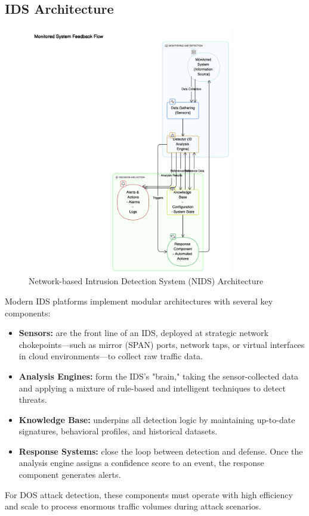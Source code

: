 \documentclass[16pt]{report}
\begin{document}
\subsection{IDS Architecture}
\begin{figure}[H]
    \centering
    \includegraphics[width=0.8\textwidth]{images/ids-arch-diagram.png}
    \caption{Network-based Intrusion Detection System (NIDS) Architecture}
    \label{fig:nids-architecture}
\end{figure}

Modern IDS platforms implement modular architectures with several key components:
\begin{itemize}
    \item \textbf{Sensors:} are the front line of an IDS, deployed at strategic network chokepoints—such as mirror (SPAN) ports, network taps, or virtual interfaces in cloud environments—to collect raw traffic data.
    \item \textbf{Analysis Engines:} form the IDS's "brain," taking the sensor-collected data and applying a mixture of rule-based and intelligent techniques to detect threats.
    \item \textbf{Knowledge Base:} underpins all detection logic by maintaining up-to-date signatures, behavioral profiles, and historical datasets.
    \item \textbf{Response Systems:} close the loop between detection and defense. Once the analysis engine assigns a confidence score to an event, the response component generates alerts.
\end{itemize}
For DOS attack detection, these components must operate with high efficiency and scale to process enormous traffic volumes during attack scenarios.
\end{document}
